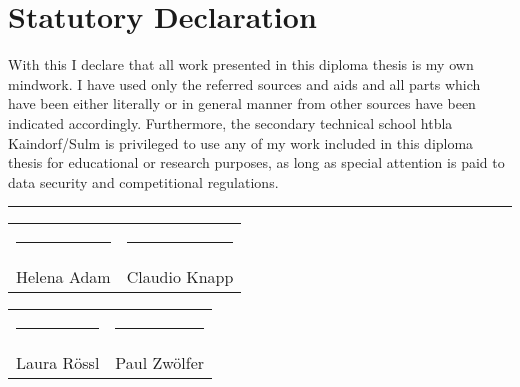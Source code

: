 \chapter*{Statutory Declaration}
With this I declare that all work presented in this diploma thesis is my own mindwork. I have used only the referred sources and aids and all parts which have been either literally or in general manner from other sources have been indicated accordingly.
\newline \newline
Furthermore, the secondary technical school \gls{htbla} Kaindorf/Sulm is privileged to use any of my work included in this diploma thesis for educational or research purposes, as long as special attention is paid to data security and competitional regulations.
\par\bigskip

\par\bigskip

\par\bigskip

\par\bigskip

\par\bigskip

\par\bigskip

\par\bigskip

\par\bigskip

\par\bigskip

\par\bigskip

\par\bigskip

\par\bigskip

\rule{\textwidth}{1pt}

\begin{tabular}{p{7cm}p{7cm}}
\rule{6cm}{0.4pt} & \rule{6cm}{0.4pt}\\
Helena Adam & Claudio Knapp
\end{tabular}

\par\bigskip

\par\bigskip

\par\bigskip

\par\bigskip

\par\bigskip

\par\bigskip

\begin{tabular}{p{7cm}p{7cm}}
\rule{6cm}{0.4pt} & \rule{6cm}{0.4pt}\\
Laura Rössl & Paul Zwölfer
\end{tabular}


